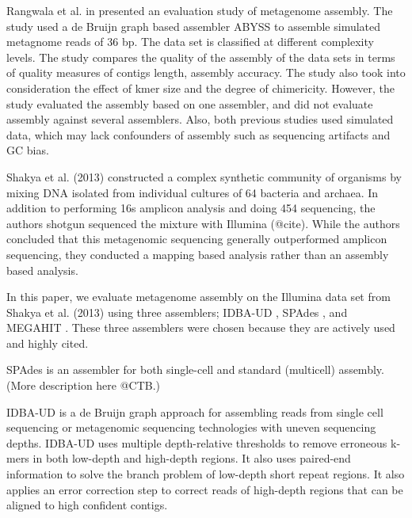 \documentclass[10pt,a4paper,twocolumn]{article}
\begin{document}
Rangwala et al. in \cite{huzefa2011} presented an evaluation study of
metagenome assembly. The study used a de Bruijn graph based assembler
ABYSS \cite{abyss} to assemble simulated metagnome reads of 36 bp. The
data set is classified at different complexity levels.
The study compares the quality of the assembly of the data sets in
terms of quality measures of contigs length, assembly accuracy. The
study also took into consideration the effect of kmer size and the
degree of chimericity.  However, the study evaluated the assembly
based on one assembler, and did not evaluate assembly against several
assemblers.  Also, both previous studies used simulated data, which
may lack confounders of assembly such as sequencing artifacts and GC bias.

Shakya et al. (2013) constructed a complex synthetic community of
organisms by mixing DNA isolated from individual cultures of 64
bacteria and archaea.  In addition to performing 16s amplicon analysis
and doing 454 sequencing, the authors shotgun sequenced the mixture
with Illumina (@cite).  While the authors concluded that this metagenomic
sequencing generally outperformed amplicon sequencing, they conducted
a mapping based analysis rather than an assembly based analysis.


In this paper, we evaluate metagenome assembly on the Illumina data set from
Shakya et al. (2013) using three assemblers; IDBA-UD \cite{idba},
SPAdes \cite {spades}, and MEGAHIT \cite{megahit}.  These three assemblers
were chosen because they are actively used and highly cited.

SPAdes \cite{spades} is an assembler for both single-cell and standard
(multicell) assembly. (More description here @CTB.)

IDBA-UD \cite{idba} is a de Bruijn graph
approach for assembling reads from single cell sequencing or
metagenomic sequencing technologies with uneven sequencing
depths. IDBA-UD uses multiple depth-relative thresholds to remove
erroneous k-mers in both low-depth and high-depth regions. It also
uses paired-end information to solve the branch problem of low-depth
short repeat regions. It also applies an error correction step to correct
reads of high-depth regions that can be aligned to high confident
contigs.
\end{document}
